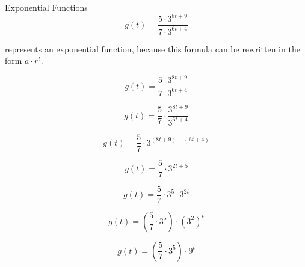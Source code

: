 \documentclass{ximera}
\begin{document}
\begin{example}  Exponential Functions \\



\[ g(t) = \frac{5 \cdot 3^{8 t + 9}}{7 \cdot 3^{6 t + 4}} \]

represents an exponential function, because this formula can be rewritten in the form $a \cdot r^t$.   \\


\begin{explanation}


\[ g(t) = \frac{5 \cdot 3^{8 t + 9}}{7 \cdot 3^{6 t + 4}} \]



\[ 
g(t) = \frac{5}{7} \cdot \frac{3^{8 t + 9}}{3^{6 t + 4}} 
\]



\[ 
g(t) = \frac{5}{7} \cdot 3^{(8 t + 9)-(6 t + 4)}
\]




\[ 
g(t) = \frac{5}{7} \cdot 3^{2 t + 5}
\]


\[ 
g(t) = \frac{5}{7} \cdot 3^5 \cdot 3^{2 t}
\]



\[ 
g(t) = \left( \frac{5}{7} \cdot 3^5 \right) \cdot (3^2)^t
\]




\[ 
g(t) = \left( \frac{5}{7} \cdot 3^5 \right) \cdot 9^t
\]








\end{explanation}

\end{example}
\end{document}
